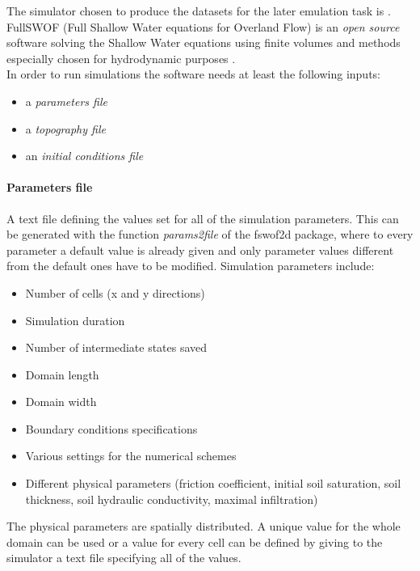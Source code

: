 The simulator chosen to produce the datasets for the later emulation task is . FullSWOF (Full Shallow Water equations for Overland Flow) is an \emph{open source} software solving the Shallow Water equations using finite volumes and methods especially chosen for hydrodynamic purposes \autocite{the_fullswof_team_fullswof_2018}.\\

In order to run simulations the software needs at least the following inputs:

\begin{itemize}
\itemsep0em
  \item a \emph{parameters file}
  \item a \emph{topography file}
  \item an \emph{initial conditions file}
\end{itemize}

\paragraph{Parameters file} A text file defining the values set for all of the simulation parameters. This can be generated with the function \textit{params2file} of the fswof2d package, where to every parameter a default value is already given and only parameter values different from the default ones have to be modified. Simulation parameters include:

\begin{itemize}
\itemsep0em
  \item Number of cells (x and y directions)
  \item Simulation duration
  \item Number of intermediate states saved
  \item Domain length
  \item Domain width
  \item Boundary conditions specifications
  \item Various settings for the numerical schemes
  \item Different physical parameters (friction coefficient, initial soil saturation, soil thickness, soil hydraulic conductivity, maximal infiltration)
\end{itemize}

The physical parameters are spatially distributed. A unique value for the whole domain can be used or a value for every cell can be defined by giving to the simulator a text file specifying all of the values.\\

